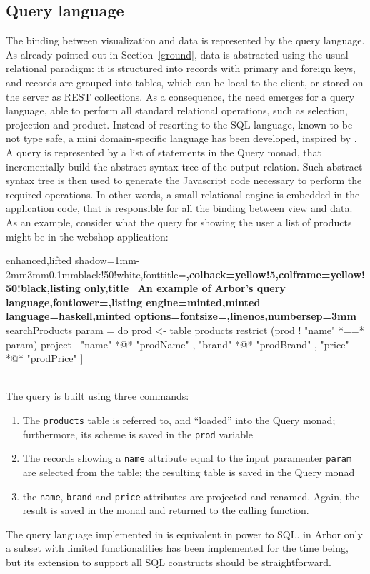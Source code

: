 \documentclass[12pt]{article} %
\newcommand{\dsl}{domain-specific language}
\newcommand{\abs}{abstract syntax tree}
\newcommand{\A}{Arbor}
\newcommand{\myverb}[1]{\texttt{\footnotesize #1}}
\newcommand{\q}[1]{``#1''}
\begin{document}
\subsection{Query language}\label{query}
The binding between visualization and data is represented by the query language. As already pointed out in Section~\ref{ground}, data is abstracted using the usual relational paradigm: it is structured into records with primary and foreign keys, and records are grouped into tables, which can be local to the client, or stored on the server as REST collections. As a consequence, the need emerges for a query language, able to perform all standard relational operations, such as selection, projection and product. Instead of resorting to the SQL language, known to be not type safe, a mini \dsl{} has been developed, inspired by \cite{leijen}. A query is represented by a list of statements in the Query monad, that incrementally build the \abs{} of the output relation. Such \abs{} is then used to generate the Javascript code necessary to perform the required operations. In other words, a small relational engine is embedded in the application code, that is responsible for all the binding between view and data.
As an example, consider what the query for showing the user a list of products might be in the webshop application:\\
\begin{tcblisting}{enhanced,lifted shadow={1mm}{-2mm}{3mm}{0.1mm}{black!50!white},fonttitle=\bfseries,colback=yellow!5,colframe=yellow!50!black,listing only,title=An example of \A{}'s query language,fontlower=\sffamily\bfseries,listing engine=minted,minted language=haskell,minted options={fontsize=\fontsize{7}{8}\selectfont,linenos,numbersep=3mm}}
searchProducts param = do 
    prod <- table products
    restrict (prod ! "name" *==* param)
    project [ "name"  *@* "prodName"
            , "brand" *@* "prodBrand"
            , "price" *@* "prodPrice"
            ]
\end{tcblisting}
~\\
The query is built using three commands:
\begin{enumerate}
\item The \myverb{products} table is referred to, and \q{loaded} into the Query monad; furthermore, its scheme is saved in the \myverb{prod} variable
\item The records showing a \myverb{name} attribute equal to the input paramenter \myverb{param} are selected from the table; the resulting table is saved in the Query monad 
\item the \myverb{name}, \myverb{brand} and \myverb{price} attributes are projected and renamed. Again, the result is saved in the monad and returned to the calling function.
\end{enumerate}
The query language implemented in \cite{leijen} is equivalent in power to SQL. in \A{} only a subset with limited functionalities has been implemented for the time being, but its extension to support all SQL constructs should be straightforward.
\end{document}
